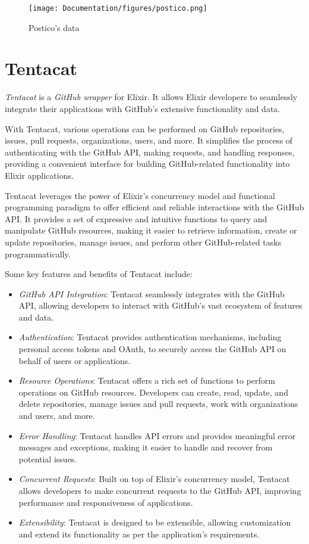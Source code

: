 \begin{figure}[htbp]
	\centering
	\texttt{[image: Documentation/figures/postico.png]}  %
	\caption{Postico's data}
	\label{fig:postico}
\end{figure}


\section{Tentacat} \label{tentacat}

\textit{Tentacat} is a \textit{GitHub wrapper} for Elixir. It allows Elixir developers to seamlessly integrate their applications with GitHub's extensive functionality and data.

With Tentacat, various operations can be performed on GitHub repositories, issues, pull requests, organizations, users, and more. It simplifies the process of authenticating with the GitHub API, making requests, and handling responses, providing a convenient interface for building GitHub-related functionality into Elixir applications.

Tentacat leverages the power of Elixir's concurrency model and functional programming paradigm to offer efficient and reliable interactions with the GitHub API. It provides a set of expressive and intuitive functions to query and manipulate GitHub resources, making it easier to retrieve information, create or update repositories, manage issues, and perform other GitHub-related tasks programmatically.

Some key features and benefits of Tentacat include:

\begin{itemize}
    \item \textit{GitHub API Integration}: Tentacat seamlessly integrates with the GitHub API, allowing developers to interact with GitHub's vast ecosystem of features and data.
    \item \textit{Authentication}: Tentacat provides authentication mechanisms, including personal access tokens and OAuth, to securely access the GitHub API on behalf of users or applications.
    \item \textit{Resource Operations}: Tentacat offers a rich set of functions to perform operations on GitHub resources. Developers can create, read, update, and delete repositories, manage issues and pull requests, work with organizations and users, and more.
    \item \textit{Error Handling}: Tentacat handles API errors and provides meaningful error messages and exceptions, making it easier to handle and recover from potential issues.
    \item \textit{Concurrent Requests}: Built on top of Elixir's concurrency model, Tentacat allows developers to make concurrent requests to the GitHub API, improving performance and responsiveness of applications.
    \item \textit{Extensibility}: Tentacat is designed to be extensible, allowing customization and extend its functionality as per the application's requirements.
    \cite{tentacat}
\end{itemize}

